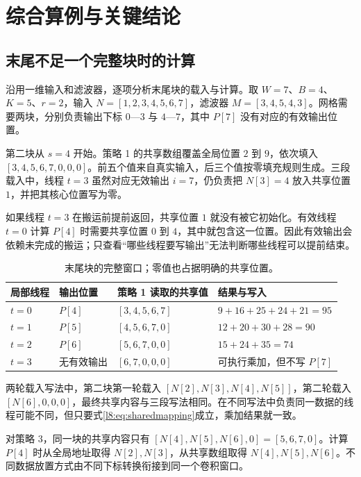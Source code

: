 \section{综合算例与关键结论}
\label{l8:sec:examples}
\subsection{末尾不足一个完整块时的计算}
沿用一维输入和滤波器，逐项分析末尾块的载入与计算。取 $W=7$、$B=4$、$K=5$、$r=2$，输入 $N=[1,2,3,4,5,6,7]$，滤波器 $M=[3,4,5,4,3]$。网格需要两块，分别负责输出下标 $0$—$3$ 与 $4$—$7$，其中 $P[7]$ 没有对应的有效输出位置。

第二块从 $s=4$ 开始。策略 1 的共享数组覆盖全局位置 $2$ 到 $9$，依次填入 $[3,4,5,6,7,0,0,0]$。前五个值来自真实输入，后三个值按零填充规则生成。三段载入中，线程 $t=3$ 虽然对应无效输出 $i=7$，仍负责把 $N[3]=4$ 放入共享位置 $1$，并把其核心位置写为零。

如果线程 $t=3$ 在搬运前提前返回，共享位置 $1$ 就没有被它初始化。有效线程 $t=0$ 计算 $P[4]$ 时需要共享位置 $0$ 到 $4$，其中就包含这一位置。因此有效输出会依赖未完成的搬运；只查看“哪些线程要写输出”无法判断哪些线程可以提前结束。

\begin{table}[H]
\centering\small
\begin{tabularx}{\textwidth}{@{}p{}p{}p{}Y@{}}
\toprule
局部线程 & 输出位置 & 策略 1 读取的共享值 & 结果与写入 \\
\midrule
$t=0$ & $P[4]$ & $[3,4,5,6,7]$ & $9+16+25+24+21=95$ \\
$t=1$ & $P[5]$ & $[4,5,6,7,0]$ & $12+20+30+28=90$ \\
$t=2$ & $P[6]$ & $[5,6,7,0,0]$ & $15+24+35=74$ \\
$t=3$ & 无有效输出 & $[6,7,0,0,0]$ & 可执行乘加，但不写 $P[7]$ \\
\bottomrule
\end{tabularx}
\caption{末尾块的完整窗口；零值也占据明确的共享位置。}
\end{table}

两轮载入写法中，第二块第一轮载入 $[N[2],N[3],N[4],N[5]]$，第二轮载入 $[N[6],0,0,0]$，最终共享内容与三段写法相同。在不同写法中负责同一数据的线程可能不同，但只要式\eqref{l8:eq:sharedmapping}成立，乘加结果就一致。

对策略 3，同一块的共享内容只有 $[N[4],N[5],N[6],0]=[5,6,7,0]$。计算 $P[4]$ 时从全局地址取得 $N[2],N[3]$，从共享数组取得 $N[4],N[5],N[6]$。不同数据放置方式由不同下标转换衔接到同一个卷积窗口。


